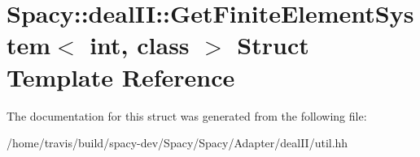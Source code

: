 \hypertarget{structSpacy_1_1dealII_1_1GetFiniteElementSystem}{\section{Spacy\-:\-:deal\-I\-I\-:\-:Get\-Finite\-Element\-System$<$ int, class $>$ Struct Template Reference}
\label{structSpacy_1_1dealII_1_1GetFiniteElementSystem}
}


The documentation for this struct was generated from the following file\-:\begin{DoxyCompactItemize}
\item 
/home/travis/build/spacy-\/dev/\-Spacy/\-Spacy/\-Adapter/deal\-I\-I/util.\-hh\end{DoxyCompactItemize}
